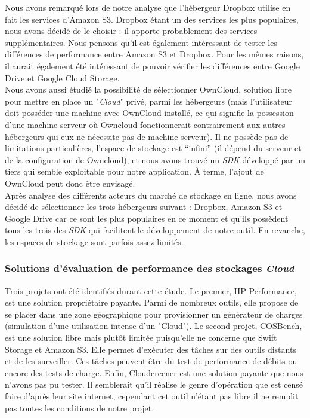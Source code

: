 \documentclass[10pt]{article}
\begin{document}
Nous avons remarqué lors de notre analyse que l’hébergeur Dropbox utilise en
fait les services d'Amazon S3. Dropbox étant un des services les plus
populaires, nous avons décidé de le choisir : il apporte probablement des
services supplémentaires. Nous pensons qu’il est également intéressant de
tester les différences de performance entre Amazon S3 et Dropbox. Pour les
mêmes raisons, il aurait également été intéressant de pouvoir vérifier les
différences entre Google Drive et Google Cloud Storage.\\

Nous avons aussi étudié la possibilité de sélectionner OwnCloud, solution libre
pour mettre en place un "\textit{Cloud}" privé, parmi les hébergeurs (mais
l’utilisateur doit posséder une machine avec OwnCloud installé, ce qui signifie
la possession d'une machine serveur où Owncloud fonctionnerait contrairement
aux autres hébergeurs qui eux ne nécessite pas de machine serveur). Il ne
possède pas de limitations particulières, l’espace de stockage est “infini” (il
dépend du serveur et de la configuration de Owncloud), et nous avons trouvé un
\textit{SDK} développé par un tiers qui semble exploitable pour notre
application. À terme, l’ajout de OwnCloud peut donc être envisagé.\\ Après
analyse des différents acteurs du marché de stockage en ligne, nous avons
décidé de sélectionner les trois hébergeurs suivant : Dropbox, Amazon S3 et
Google Drive car ce sont les plus populaires en ce moment et qu'ils possèdent
tous les trois des \textit{SDK} qui facilitent le développement de notre outil.
En revanche, les espaces de stockage sont parfois assez limités.

\subsubsection{Solutions d'évaluation de performance des stockages
\textit{Cloud}}

Trois projets ont été identifiés durant cette étude. Le premier, HP
Performance, est une solution propriétaire payante. Parmi de nombreux outils,
elle propose de se placer dans une zone géographique pour provisionner un
générateur de charges (simulation d'une utilisation intense d'un "Cloud"). Le
second projet, COSBench, est une solution libre mais plutôt limitée puisqu’elle
ne concerne que Swift Storage et Amazon S3. Elle permet d'exécuter des tâches
sur des outils distants et de les surveiller. Ces tâches peuvent être du test
de performance de débits ou encore des tests de charge. Enfin, Cloudcreener est
une solution payante que nous n’avons pas pu tester. Il semblerait qu'il
réalise le genre d'opération que \KYD est censé faire d'après leur site
internet, cependant cet outil n'étant pas libre il ne remplit pas toutes les
conditions de notre projet.
\end{document}
